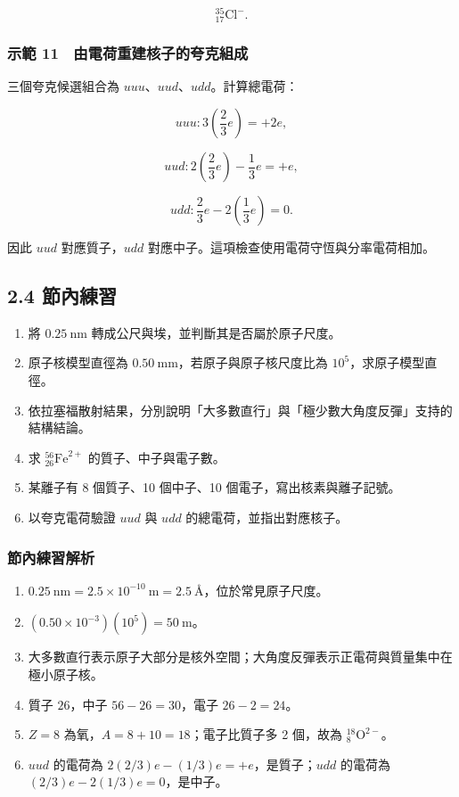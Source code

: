 \documentclass[11pt,a4paper]{article}
\providecommand{\tightlist}{%
  \setlength{\itemsep}{0pt}\setlength{\parskip}{0pt}}
\begin{document}
\[
{}^{35}_{17}\mathrm{Cl}^{-}.
\]

\subsubsection{示範 11　由電荷重建核子的夸克組成}\label{ux793aux7bc4-11-ux7531ux96fbux8377ux91cdux5efaux6838ux5b50ux7684ux5938ux514bux7d44ux6210}

三個夸克候選組合為 \(uuu\)、\(uud\)、\(udd\)。計算總電荷：

\[
uuu: 3\left(\frac{2}{3}e\right)=+2e,
\]

\[
uud: 2\left(\frac{2}{3}e\right)-\frac{1}{3}e=+e,
\]

\[
udd: \frac{2}{3}e-2\left(\frac{1}{3}e\right)=0.
\]

因此 \(uud\) 對應質子，\(udd\) 對應中子。這項檢查使用電荷守恆與分率電荷相加。

\subsection{2.4 節內練習}\label{ux7bc0ux5167ux7df4ux7fd2-1}

\begin{enumerate}
\def\labelenumi{\arabic{enumi}.}
\tightlist
\item
  將 \(0.25\ \mathrm{nm}\) 轉成公尺與埃，並判斷其是否屬於原子尺度。
\item
  原子核模型直徑為 \(0.50\ \mathrm{mm}\)，若原子與原子核尺度比為 \(10^5\)，求原子模型直徑。
\item
  依拉塞福散射結果，分別說明「大多數直行」與「極少數大角度反彈」支持的結構結論。
\item
  求 \({}^{56}_{26}\mathrm{Fe}^{2+}\) 的質子、中子與電子數。
\item
  某離子有 8 個質子、10 個中子、10 個電子，寫出核素與離子記號。
\item
  以夸克電荷驗證 \(uud\) 與 \(udd\) 的總電荷，並指出對應核子。
\end{enumerate}

\subsubsection{節內練習解析}\label{ux7bc0ux5167ux7df4ux7fd2ux89e3ux6790-1}

\begin{enumerate}
\def\labelenumi{\arabic{enumi}.}
\tightlist
\item
  \(0.25\ \mathrm{nm}=2.5\times10^{-10}\ \mathrm m=2.5\ \text{Å}\)，位於常見原子尺度。
\item
  \((0.50\times10^{-3})(10^5)=50\ \mathrm m\)。
\item
  大多數直行表示原子大部分是核外空間；大角度反彈表示正電荷與質量集中在極小原子核。
\item
  質子 \(26\)，中子 \(56-26=30\)，電子 \(26-2=24\)。
\item
  \(Z=8\) 為氧，\(A=8+10=18\)；電子比質子多 2 個，故為 \({}^{18}_{8}\mathrm O^{2-}\)。
\item
  \(uud\) 的電荷為 \(2(2/3)e-(1/3)e=+e\)，是質子；\(udd\) 的電荷為 \((2/3)e-2(1/3)e=0\)，是中子。
\end{enumerate}
\end{document}
